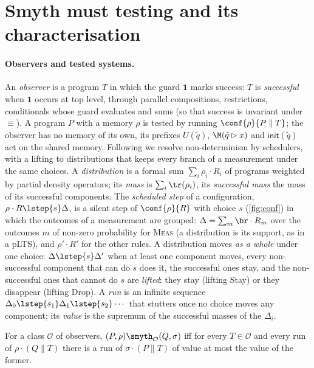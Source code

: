 \section{Smyth must testing and its characterisation}\label{sec:must}

\paragraph{Observers and tested systems.} An \emph{observer} is a program $T$
in which the guard $\mathbf{1}$ marks success: $T$ is \emph{successful} when
$\mathbf{1}$ occurs at top level, through parallel compositions,
restrictions, conditionals whose guard evaluates and sums (so that success
is invariant under $\equiv$). A program $P$ with a memory $\rho$ is tested
by running $\conf{\rho}{P \parallel T}$; the observer has no memory of its
own, its prefixes $U(\tilde q)$, $\M(\tilde q \rhd x)$ and
$\mathsf{init}(\tilde q)$ act on the shared memory. Following
\cite{Ceragioli27} we resolve non-determinism by schedulers, with a lifting
to distributions that keeps every branch of a measurement under the same
choices. A \emph{distribution} is a formal sum $\sum_i \rho_i \cdot R_i$ of
programs weighted by partial density operators; its \emph{mass} is
$\sum_i \tr(\rho_i)$, its \emph{successful mass} the mass of its successful
components. The \emph{scheduled step} of a configuration,
$\rho \cdot R \lstep{s} \Delta$, is a silent step of $\conf{\rho}{R}$ with
choice $s$ (\cref{fig:conf}) in which the outcomes of a measurement are
grouped: $\Delta = \sum_m \br \cdot R_m$ over the outcomes $m$ of non-zero
probability for \textsc{Meas} (a distribution is its support, as in a
pLTS), and $\rho' \cdot R'$ for the other rules. A distribution moves \emph{as a whole}
under one choice: $\Delta \lstep{s} \Delta'$ when at least one component
moves, every non-successful component that can do $s$ does it, the
successful ones stay, and the non-successful ones that cannot do $s$ are
\emph{lifted}: they stay (lifting Stay) or they disappear (lifting Drop).
A \emph{run} is an infinite sequence $\Delta_0 \lstep{s_1} \Delta_1
\lstep{s_2} \cdots$ that stutters once no choice moves any component; its
\emph{value} is the supremum of the successful masses of the $\Delta_i$.

\begin{definition}\label{def:smyth}
For a class $\mathcal{O}$ of observers, $(P, \rho) {\smyth}_{\mathcal{O}} (Q, \sigma)$
iff for every $T \in \mathcal{O}$ and every run of $\rho \cdot (Q \parallel T)$
there is a run of $\sigma \cdot (P \parallel T)$ of value at most the value
of the former.
\end{definition}

